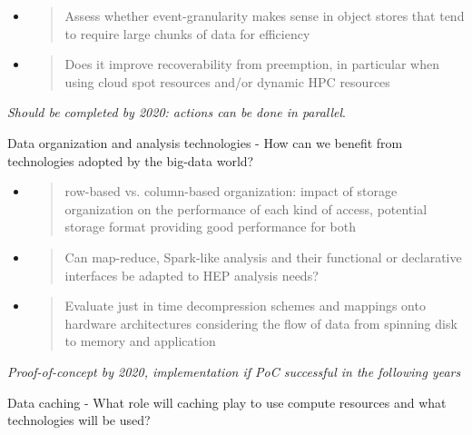\documentclass[12pt,a4paper]{article}
\begin{document}
\begin{itemize}
\item
  \begin{quote}
  \protect\hypertarget{_hhvd696t4e1b}{}{}Assess whether
  event-granularity makes sense in object stores that tend to require
  large chunks of data for efficiency
  \end{quote}
\item
  \begin{quote}
  \protect\hypertarget{_hut1j5u624ly}{}{}Does it improve recoverability
  from preemption, in particular when using cloud spot resources and/or
  dynamic HPC resources
  \end{quote}
\end{itemize}

\emph{Should be completed by
2020: actions can be done in parallel}.

\protect\hypertarget{_txtjm296wo2a}{}{}Data organization and analysis
technologies - How can we benefit from technologies adopted by the
big-data world?

\begin{itemize}
\item
  \begin{quote}
  \protect\hypertarget{_2uzvesmlywml}{}{}row-based vs. column-based
  organization: impact of storage organization on the performance of
  each kind of access, potential storage format providing good
  performance for both
  \end{quote}
\item
  \begin{quote}
  \protect\hypertarget{_6xwv25emxnty}{}{}Can map-reduce, Spark-like
  analysis and their functional or declarative interfaces be adapted to
  HEP analysis needs?
  \end{quote}
\item
  \begin{quote}
  \protect\hypertarget{_vfqvjf8nrae}{}{}Evaluate just in time
  decompression schemes and mappings onto hardware architectures
  considering the flow of data from spinning disk to memory and
  application
  \end{quote}
\end{itemize}

\emph{Proof-of-concept by 2020, implementation if PoC successful in the following years}

\protect\hypertarget{_49uk6huxen3e}{}{}Data caching - What role will
caching play to use compute resources and what technologies will be
used?
\end{document}
